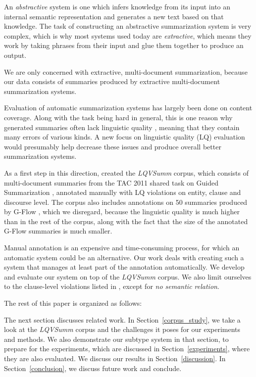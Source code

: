 \documentclass[a4paper,10pt]{scrartcl}
\theoremstyle{style}
\begin{document}
An \textit{abstractive} system is one which infers knowledge from its input into an internal semantic representation and generates a new text based on that knowledge. The task of constructing an abstractive summarization system is very complex, which is why most systems used today are \textit{extractive}, which means they work by taking phrases from their input and glue them together to produce an output.

We are only concerned with extractive, multi-document summarization, because our data consists of summaries produced by extractive multi-document summarization systems.

Evaluation of automatic summarization systems has largely been done on content coverage. Along with the task being hard in general, this is one reason why generated summaries often lack linguistic quality \citep{nenkova2011foundations}, meaning that they contain many errors of various kinds. A new focus on linguistic quality (LQ) evaluation would presumably help decrease these issues and produce overall better summarization systems.

As a first step in this direction, \cite{friedrichlqvsumm} created the \textit{LQVSumm} corpus, which consists of multi-document summaries from the TAC 2011 shared task on Guided Summarization \citep{owczarzak2011overview}, annotated manually with LQ violations on entity, clause and discourse level. The corpus also includes annotations on 50 summaries produced by G-Flow \citep{gflow}, which we disregard, because the linguistic quality is much higher than in the rest of the corpus, along with the fact that the size of the annotated G-Flow summaries is much smaller.

Manual annotation is an expensive and time-consuming process, for which an automatic system could be an alternative. Our work deals with creating such a system that manages at least part of the annotation automatically. We develop and evaluate our system on top of the \textit{LQVSumm} corpus. We also limit ourselves to the clause-level violations listed in \cite{friedrichlqvsumm}, except for \textit{no semantic relation}.

The rest of this paper is organized as follows:

The next section discusses related work. In Section~\ref{corpus_study}, we take a look at the \textit{LQVSumm} corpus and the challenges it poses for our experiments and methods. We also demonstrate our subtype system in that section, to prepare for the experiments, which are discussed in Section~\ref{experiments}, where they are also evaluated. We discuss our results in Section~\ref{discussion}. In Section~\ref{conclusion}, we discuss future work and conclude.
\end{document}
